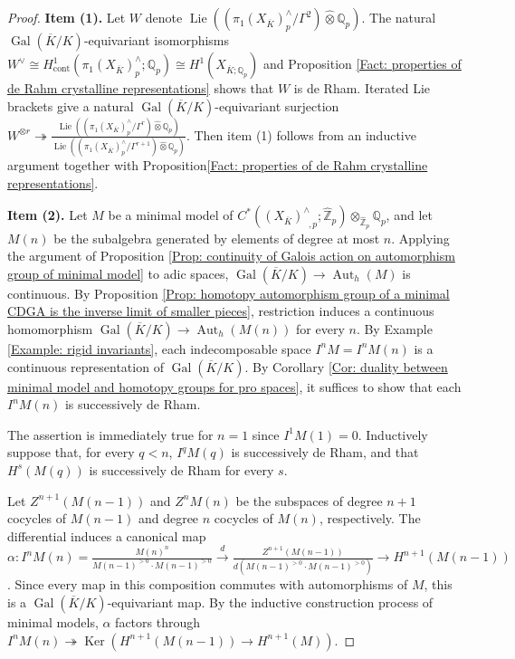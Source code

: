 \documentclass[11pt]{amsart}
\theoremstyle{definition}
\numberwithin{equation}{section}
\numberwithin{equation}{section}
\newcommand\QQ{\mathbb{Q}}
\newcommand\ZZ{\mathbb{Z}}
\DeclareMathOperator{\Aut}{Aut}
\DeclareMathOperator{\Ker}{Ker}
\DeclareMathOperator{\et}{\acute{e}t}
\DeclareMathOperator{\Gal}{Gal}
\DeclareMathOperator{\Lie}{Lie}
\DeclareMathOperator{\cont}{cont}
\begin{document}
\begin{proof}
\textbf{Item (1).} Let $W$ denote $\Lie((\pi^{\et}_1(X_{\overline{K}})^{\wedge}_{p}/\Gamma^2)\widehat{\otimes}\QQ_p)$. The natural $\Gal(\overline{K}/K)$-equivariant isomorphisms $W^{\vee}\cong H^1_{\cont}(\pi^{\et}_1(X_{\overline{K}})^{\wedge}_{p};\QQ_{p})\cong H^1_{\et}(X_{\overline{K};\QQ_p})$ and Proposition \ref{Fact: properties of de Rahm crystalline representations} shows that $W$ is de Rham. Iterated Lie brackets give a natural $\Gal(\overline{K}/K)$-equivariant surjection $W^{\otimes r}\twoheadrightarrow 
\frac{\Lie((\pi^{\et}_1(X_{\overline{K}})^{\wedge}_{p}/\Gamma^r)\widehat{\otimes}\QQ_p)}{\Lie((\pi^{\et}_1(X_{\overline{K}})^{\wedge}_{p}/\Gamma^{r+1})\widehat{\otimes}\QQ_p)}$. Then item (1) follows from an inductive argument together with Proposition\ref{Fact: properties of de Rahm crystalline representations}.


\textbf{Item (2).} Let $M$ be a minimal model of $C^*((X_{\overline{K}})^{\wedge}_{\et,p};\widehat{\ZZ}_{p})\otimes_{\widehat{\ZZ}_{p}}\QQ_{p}$, and let $M(n)$ be the subalgebra generated by elements of degree at most $n$. Applying the argument of Proposition \ref{Prop: continuity of Galois action on automorphism group of minimal model} to adic spaces, $\Gal(\overline{K}/K)\rightarrow \Aut_h(M)$ is continuous. By Proposition \ref{Prop: homotopy automorphism group of a minimal CDGA is the inverse limit of smaller pieces}, restriction induces a continuous homomorphism $\Gal(\overline{K}/K)\rightarrow \Aut_h(M(n))$ for every $n$. By Example \ref{Example: rigid invariants}, each indecomposable space $I^nM=I^nM(n)$ is a continuous representation of $\Gal(\overline{K}/K)$. By Corollary \ref{Cor: duality between minimal model and homotopy groups for pro spaces}, it suffices to show that each $I^nM(n)$ is successively de Rham.

The assertion is immediately true for $n=1$ since $I^1M(1)=0$. Inductively suppose that, for every $q<n$, $I^qM(q)$ is  successively de Rham, and that $H^s(M(q))$ is successively de Rham  for every $s$. 

Let $Z^{n+1}(M(n-1))$ and $Z^nM(n)$ be the subspaces of degree $n+1$ cocycles of $M(n-1)$ and degree $n$ cocycles of $M(n)$, respectively. The differential induces a canonical map $\alpha: I^nM(n)=\frac{M(n)^n}{M(n-1)^{>0}\cdot M(n-1)^{>0}}\xrightarrow{d} \frac{Z^{n+1}(M(n-1))}{d(M(n-1)^{>0}\cdot M(n-1)^{>0})}\rightarrow H^{n+1}(M(n-1))$. Since every map in this composition commutes with automorphisms of $M$, this is a $\Gal(\overline{K}/K)$-equivariant map. By the inductive construction process of minimal models, $\alpha$ factors through $I^nM(n)\twoheadrightarrow \Ker(H^{n+1}(M(n-1))\rightarrow H^{n+1}(M))$. 


\end{proof}
\end{document}
